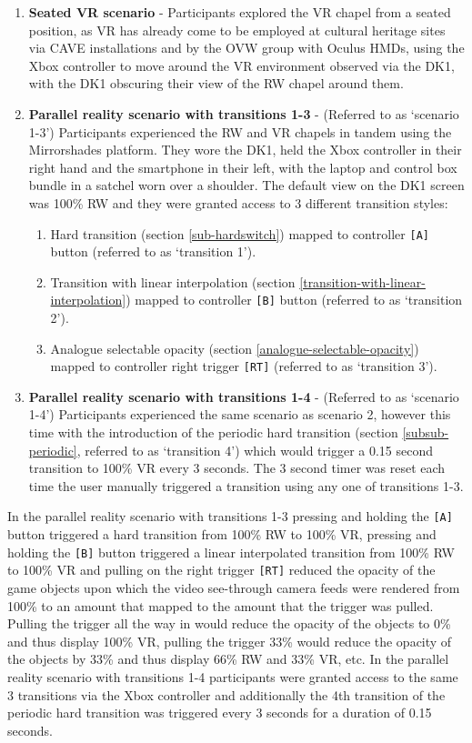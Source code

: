 \begin{enumerate}
	\item \textbf{Seated VR scenario} - Participants explored the VR chapel from a seated position, as VR has already come to be employed at cultural heritage sites via CAVE installations and by the OVW group with Oculus HMDs, using the Xbox controller to move around the VR environment observed via the DK1, with the DK1 obscuring their view of the RW chapel around them.
	\item \textbf{Parallel reality scenario with transitions 1-3} - (Referred to as `scenario 1-3') Participants experienced the RW and VR chapels in tandem using the Mirrorshades platform. They wore the DK1, held the Xbox controller in their right hand and the smartphone in their left, with the laptop and control box bundle in a satchel worn over a shoulder. The default view on the DK1 screen was 100\% RW and they were granted access to 3 different transition styles:
	\begin{enumerate}
		\item Hard transition (section \ref{sub-hardswitch}) mapped to controller \texttt{[A]} button (referred to as `transition 1').
		\item Transition with linear interpolation (section \ref{transition-with-linear-interpolation}) mapped to controller \texttt{[B]} button (referred to as `transition 2').
		\item Analogue selectable opacity (section \ref{analogue-selectable-opacity}) mapped to controller right trigger \texttt{[RT]} (referred to as `transition 3').
\end{enumerate}
	\item \textbf{Parallel reality scenario with transitions 1-4} - (Referred to as `scenario 1-4') Participants experienced the same scenario as scenario 2, however this time with the introduction of the periodic hard transition (section \ref{subsub-periodic}, referred to as `transition 4') which would trigger a 0.15 second transition to 100\% VR every 3 seconds. The 3 second timer was reset each time the user manually triggered a transition using any one of transitions 1-3.
\end{enumerate}

In the parallel reality scenario with transitions 1-3 pressing and holding the \texttt{[A]} button triggered a hard transition from 100\% RW to 100\% VR, pressing and holding the \texttt{[B]} button triggered a linear interpolated transition from 100\% RW to 100\% VR and pulling on the right trigger \texttt{[RT]} reduced the opacity of the game objects upon which the video see-through camera feeds were rendered from 100\% to an amount that mapped to the amount that the trigger was pulled. Pulling the trigger all the way in would reduce the opacity of the objects to 0\% and thus display 100\% VR, pulling the trigger 33\% would reduce the opacity of the objects by 33\% and thus display 66\% RW and 33\% VR, etc. In the parallel reality scenario with transitions 1-4 participants were granted access to the same 3 transitions via the Xbox controller and additionally the 4th transition of the periodic hard transition was triggered every 3 seconds for a duration of 0.15 seconds.

